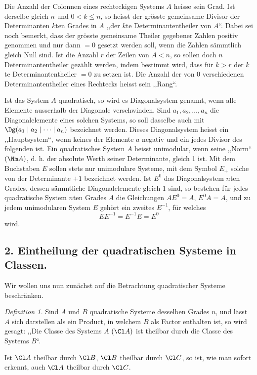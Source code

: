 Die Anzahl der Colonnen eines rechteckigen Systems $A$ heisse sein Grad. Ist derselbe gleich $n$ und $0<k\le n$, so heisst der grösste gemeinsame Divisor der Determinanten $k$ten Grades in $A$ ,,der $k$te Determinantentheiler von $A$``. Dabei sei noch bemerkt, dass der grösste gemeinsame Theiler gegebener Zahlen positiv genommen und nur dann $=0$ gesetzt werden soll, wenn die Zahlen sämmtlich gleich Null sind. Ist die Anzahl $r$ der Zeilen von $A<n$, so sollen doch $n$ Determinantentheiler gezählt werden, indem bestimmt wird, dass für $k>r$ der $k$te Determinantentheiler $=0$ zu setzen ist. Die Anzahl der von 0 verschiedenen Determinantentheiler eines Rechtecks heisst sein ,,Rang``.

Ist das System $A$ quadratisch, so wird es Diagonalsystem genannt, wenn alle Elemente ausserhalb der Diagonale verschwinden. Sind $a_1,a_2,\ldots,a_n$ die Diagonalelemente eines solchen Systems, so soll dasselbe auch mit $\Dg(a_1\mid a_2\mid\cdots\mid a_n)$ bezeichnet werden. Dieses Diagonalsystem heisst ein ,,Hauptsystem``, wenn keines der Elemente $a$ negativ und ein jedes Divisor des folgenden ist. Ein quadratisches System $A$ heisst unimodular, wenn seine ,,Norm`` $(\Nm A)$, d. h. der absolute Werth seiner Determinante, gleich 1 ist. Mit dem Buchstaben $E$ sollen stets nur unimodulare Systeme, mit dem Symbol $E_+$ solche von der Determinante $+1$ bezeichnet werden. Ist $E^0$ das Diagonalsystem $n$ten Grades, dessen sämmtliche Diagonalelemente gleich 1 sind, so bestehen für jedes quadratische System $n$ten Grades $A$ die Gleichungen $AE^0=A$, $E^0A=A$, und zu jedem unimodularen System $E$ gehört ein zweites $E^{-1}$, für welches
\[
EE^{-1}=E^{-1}E=E^0
\]
wird.

\subsection*{2. Eintheilung der quadratischen Systeme in Classen.}

Wir wollen uns nun zunächst auf die Betrachtung quadratischer Systeme beschränken.

\emph{Definition 1.} Sind $A$ und $B$ quadratische Systeme desselben Grades $n$, und lässt $A$ sich darstellen als ein Product, in welchem $B$ als Factor enthalten ist, so wird gesagt: ,,Die Classe des Systems $A$ $(\Cl A)$ ist theilbar durch die Classe des Systems $B$``.

Ist $\Cl A$ theilbar durch $\Cl B$, $\Cl B$ theilbar durch $\Cl C$, so ist, wie man sofort erkennt, auch $\Cl A$ theilbar durch $\Cl C$.

